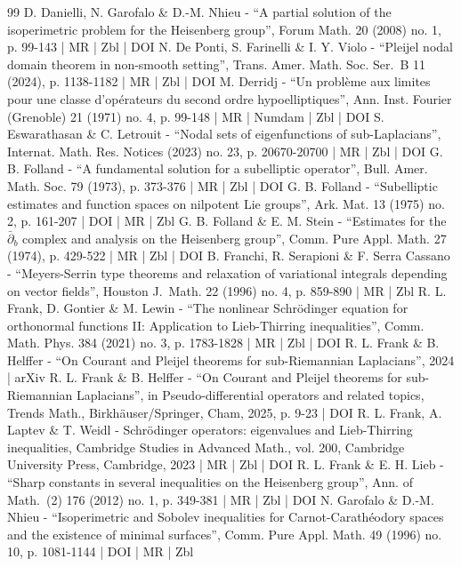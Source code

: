 \documentclass[10pt]{amsart}
\theoremstyle{definition}
\newcommand{\1}{\mathbbm{1}}
\begin{document}
\begin{thebibliography}{99}
D. Danielli, N. Garofalo \& D.-M. Nhieu - “A partial solution of the isoperimetric problem for the Heisenberg group”, Forum Math. 20 (2008) no. 1, p. 99-143 | MR | Zbl | DOI
N. De Ponti, S. Farinelli \& I. Y. Violo - “Pleijel nodal domain theorem in non-smooth setting”, Trans. Amer. Math. Soc. Ser. B 11 (2024), p. 1138-1182 | MR | Zbl | DOI
M. Derridj - “Un problème aux limites pour une classe d’opérateurs du second ordre hypoelliptiques”, Ann. Inst. Fourier (Grenoble) 21 (1971) no. 4, p. 99-148 | MR | Numdam | Zbl | DOI
S. Eswarathasan \& C. Letrouit - “Nodal sets of eigenfunctions of sub-Laplacians”, Internat. Math. Res. Notices (2023) no. 23, p. 20670-20700 | MR | Zbl | DOI
G. B. Folland - “A fundamental solution for a subelliptic operator”, Bull. Amer. Math. Soc. 79 (1973), p. 373-376 | MR | Zbl | DOI
G. B. Folland - “Subelliptic estimates and function spaces on nilpotent Lie groups”, Ark. Mat. 13 (1975) no. 2, p. 161-207 | DOI | MR | Zbl
G. B. Folland \& E. M. Stein - “Estimates for the $\bar{\partial }_{b}$ complex and analysis on the Heisenberg group”, Comm. Pure Appl. Math. 27 (1974), p. 429-522 | MR | Zbl | DOI
B. Franchi, R. Serapioni \& F. Serra Cassano - “Meyers-Serrin type theorems and relaxation of variational integrals depending on vector fields”, Houston J. Math. 22 (1996) no. 4, p. 859-890 | MR | Zbl
R. L. Frank, D. Gontier \& M. Lewin - “The nonlinear Schrödinger equation for orthonormal functions II: Application to Lieb-Thirring inequalities”, Comm. Math. Phys. 384 (2021) no. 3, p. 1783-1828 | MR | Zbl | DOI
R. L. Frank \& B. Helffer - “On Courant and Pleijel theorems for sub-Riemannian Laplacians”, 2024 | arXiv
R. L. Frank \& B. Helffer - “On Courant and Pleijel theorems for sub-Riemannian Laplacians”, in Pseudo-differential operators and related topics, Trends Math., Birkhäuser/Springer, Cham, 2025, p. 9-23 | DOI
R. L. Frank, A. Laptev \& T. Weidl - Schrödinger operators: eigenvalues and Lieb-Thirring inequalities, Cambridge Studies in Advanced Math., vol. 200, Cambridge University Press, Cambridge, 2023 | MR | Zbl | DOI
R. L. Frank \& E. H. Lieb - “Sharp constants in several inequalities on the Heisenberg group”, Ann. of Math. (2) 176 (2012) no. 1, p. 349-381 | MR | Zbl | DOI
N. Garofalo \& D.-M. Nhieu - “Isoperimetric and Sobolev inequalities for Carnot-Carathéodory spaces and the existence of minimal surfaces”, Comm. Pure Appl. Math. 49 (1996) no. 10, p. 1081-1144 | DOI | MR | Zbl

\end{thebibliography}
\end{document}
